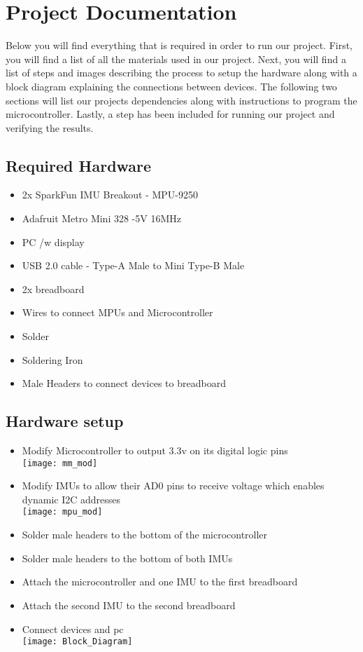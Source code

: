 \newpage
\section{Project Documentation}
Below you will find everything that is required in order to run our project.
First, you will find a list of all the materials used in our project.
Next, you will find a list of steps and images describing the process to setup the hardware along with a block diagram explaining the connections between devices.
The following two sections will list our projects dependencies along with instructions to program the microcontroller.
Lastly, a step has been included for running our project and verifying the results. \\

\subsection*{Required Hardware}
\begin{itemize}
\item{2x SparkFun IMU Breakout - MPU-9250}
\item{Adafruit Metro Mini 328 -5V 16MHz}
\item{PC /w display}
\item{USB 2.0 cable - Type-A Male to Mini Type-B Male}
\item{2x breadboard}
\item{Wires to connect MPUs and Microcontroller}
\item{Solder}
\item{Soldering Iron}
\item{Male Headers to connect devices to breadboard}
\end{itemize}

\subsection*{Hardware setup}
\begin{itemize}
\item{Modify Microcontroller to output 3.3v on its digital logic pins \\ \texttt{[image: mm\_mod]}}
\item{Modify IMUs to allow their AD0 pins to receive voltage which enables dynamic I2C addresses \\ \texttt{[image: mpu\_mod]}}
\item{Solder male headers to the bottom of the microcontroller}
\item{Solder male headers to the bottom of both IMUs}
\item{Attach the microcontroller and one IMU to the first breadboard}
\item{Attach the second IMU to the second breadboard}
\item{Connect devices and pc \\ \texttt{[image: Block\_Diagram]}}

\end{itemize}

